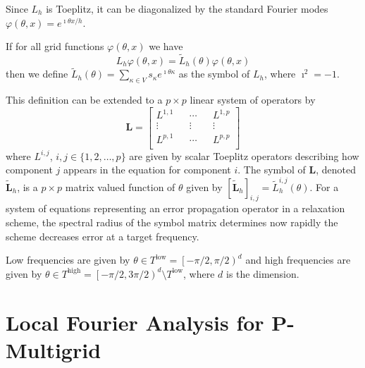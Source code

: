 \documentclass[review]{siamart190516}
\begin{document}
Since $L_h$ is Toeplitz, it can be diagonalized by the standard Fourier modes $\varphi \left( \theta, x \right) = e^{\imath \theta x / h}$.

\begin{definition}[Symbol of $L_h$]\label{def:symbol}
If for all grid functions $\varphi \left( \theta, x \right)$ we have
\begin{equation}
L_h \varphi \left( \theta, x \right) = \tilde{L}_h \left( \theta \right) \varphi \left( \theta, x \right)
\end{equation}
then we define $\tilde{L}_h \left( \theta \right) = \sum_{\kappa \in V} s_\kappa e^{\imath \theta \kappa}$ as the symbol of $L_h$, where $\imath^2 = -1$.
\end{definition}

This definition can be extended to a $p \times p$ linear system of operators by
\begin{equation}
\mathbf{L} =
\begin{bmatrix}
    L^{1, 1} && \cdots && L^{1, p}          \\
    \vdots             && \vdots && \vdots  \\
    L^{p, 1} && \cdots && L^{p, p}          \\
\end{bmatrix}
\end{equation}
where $L^{i, j}$, $i, j \in \lbrace 1, 2, \dots, p \rbrace$ are given by scalar Toeplitz operators describing how component $j$ appears in the equation for component $i$.
The symbol of $\mathbf{L}$, denoted $\tilde{\mathbf{L}}_h$, is a $p \times p$ matrix valued function of $\theta$ given by $\left[ \tilde{\mathbf{L}}_h \right]_{i, j} = \tilde{L}_h^{i, j} \left( \theta \right)$.
For a system of equations representing an error propagation operator in a relaxation scheme, the spectral radius of the symbol matrix determines now rapidly the scheme decreases error at a target frequency.

Low frequencies are given by $\theta \in T^{\text{low}} = \left[ - \pi / 2, \pi / 2 \right)^d$ and high frequencies are given by $\theta \in T^{\text{high}} = \left[ - \pi / 2, 3 \pi / 2 \right)^d \setminus T^{\text{low}}$, where $d$ is the dimension.

\section{Local Fourier Analysis for P-Multigrid}\label{sec:lfa}
\end{document}
